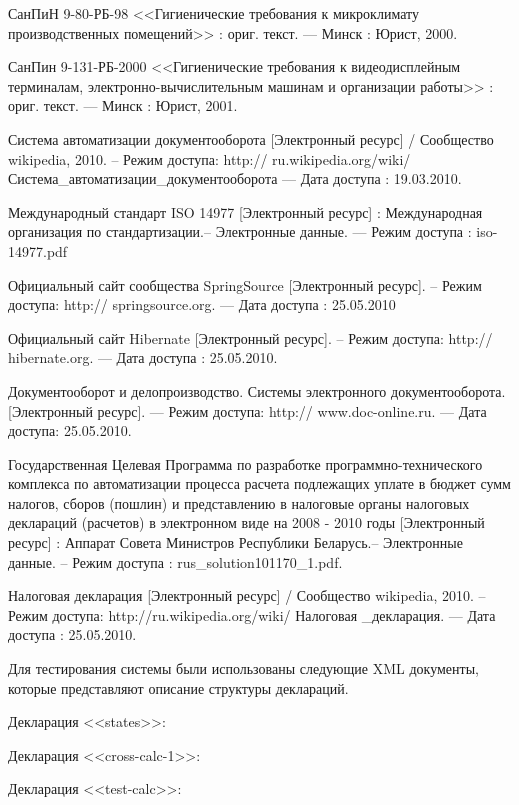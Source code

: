 \documentclass[14pt,a4paper]{reportmod}
\begin{document}
\begin{thebibliography}{99}
 СанПиН 9-80-РБ-98  <<Гигиенические требования к микроклимату производственных помещений>> : ориг. текст. --- Минск : Юрист, 2000.

 СанПин 9-131-РБ-2000 <<Гигиенические требования к видеодисплейным терминалам, электронно-вычислительным машинам и организации работы>> : ориг. текст. --- Минск : Юрист, 2001.

 Система автоматизации документооборота [Электронный ресурс] / Сообщество wikipedia, 2010. -- Режим доступа: http:// ru.wikipedia.org/wiki/Система\_автоматизации\_документооборота --- Дата доступа : 19.03.2010.

 Международный стандарт ISO 14977 [Электронный ресурс] : Международная организация по стандартизации.-- Электронные данные. --- Режим доступа : iso-14977.pdf

 Официальный сайт сообщества SpringSource  [Электронный ресурс]. -- Режим доступа: http:// springsource.org. --- Дата доступа : 25.05.2010

 Официальный сайт Hibernate  [Электронный ресурс]. -- Режим доступа: http:// hibernate.org. --- Дата доступа : 25.05.2010.

 Документооборот и делопроизводство. Системы электронного документооборота. [Электронный ресурс]. --- Режим доступа: http:// www.doc-online.ru. --- Дата доступа: 25.05.2010.

 Государственная Целевая Программа по разработке программно-технического комплекса по автоматизации процесса расчета подлежащих уплате в бюджет сумм налогов, сборов (пошлин) и представлению в налоговые органы налоговых деклараций (расчетов) в электронном виде на 2008 - 2010 годы [Электронный ресурс] : Аппарат Совета Министров Республики Беларусь.-- Электронные данные. -- Режим доступа : rus\_solution101170\_1.pdf.

 Налоговая декларация [Электронный ресурс] / Сообщество wikipedia, 2010. -- Режим доступа: http://ru.wikipedia.org/wiki/ Налоговая \_декларация. --- Дата доступа : 25.05.2010.

\end{thebibliography}

Для тестирования системы были использованы следующие XML документы, которые представляют описание структуры деклараций.

Декларация <<states>>:


Декларация <<cross-calc-1>>:



Декларация <<test-calc>>:

\end{document}
